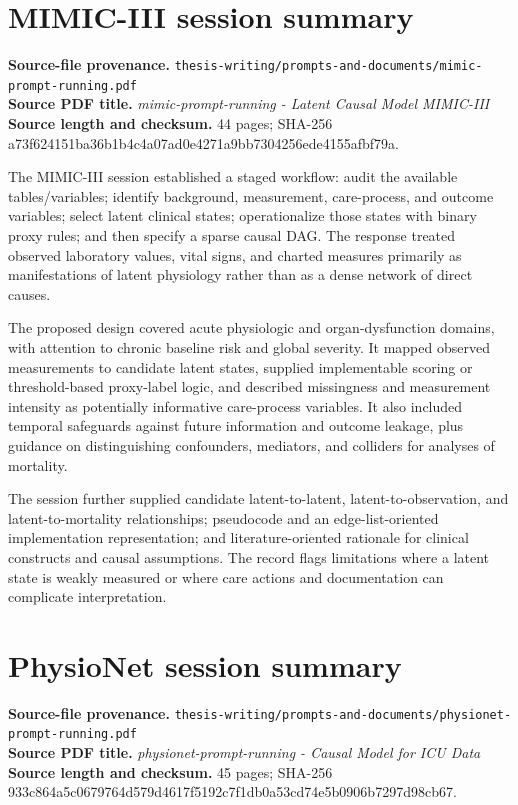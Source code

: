 \documentclass[11pt,a4paper]{article}
\newcommand{\sourcepath}[1]{{\footnotesize\nolinkurl{#1}}}
\newcommand{\mimichash}{{\scriptsize\ttfamily 56271465\allowbreak a73f6241\allowbreak 51ba36b1\allowbreak b4c4a07a\allowbreak d0e4271a\allowbreak 9bb73042\allowbreak 56ede415\allowbreak 5afbf79a}}
\newcommand{\physionethash}{{\scriptsize\ttfamily 933c864a\allowbreak 5c067976\allowbreak 4d579d46\allowbreak 17f5192c\allowbreak 7f1db0a5\allowbreak 3cd74e5b\allowbreak 0906b729\allowbreak 7d98cb67}}
\begin{document}
\section{MIMIC-III session summary}
\textbf{Source-file provenance.} \sourcepath{thesis-writing/prompts-and-documents/mimic-prompt-running.pdf}\\
\textbf{Source PDF title.} \emph{mimic-prompt-running - Latent Causal Model MIMIC-III}\\
\textbf{Source length and checksum.} 44 pages; SHA-256 \mimichash.

The MIMIC-III session established a staged workflow: audit the available
tables/variables; identify background, measurement, care-process, and outcome
variables; select latent clinical states; operationalize those states with
binary proxy rules; and then specify a sparse causal DAG. The response treated
observed laboratory values, vital signs, and charted measures primarily as
manifestations of latent physiology rather than as a dense network of direct
causes.

The proposed design covered acute physiologic and organ-dysfunction domains,
with attention to chronic baseline risk and global severity. It mapped observed
measurements to candidate latent states, supplied implementable scoring or
threshold-based proxy-label logic, and described missingness and measurement
intensity as potentially informative care-process variables. It also included
temporal safeguards against future information and outcome leakage, plus
guidance on distinguishing confounders, mediators, and colliders for analyses
of mortality.

The session further supplied candidate latent-to-latent, latent-to-observation,
and latent-to-mortality relationships; pseudocode and an edge-list-oriented
implementation representation; and literature-oriented rationale for clinical
constructs and causal assumptions. The record flags limitations where a latent
state is weakly measured or where care actions and documentation can complicate
interpretation.

\section{PhysioNet session summary}
\textbf{Source-file provenance.} \sourcepath{thesis-writing/prompts-and-documents/physionet-prompt-running.pdf}\\
\textbf{Source PDF title.} \emph{physionet-prompt-running - Causal Model for ICU Data}\\
\textbf{Source length and checksum.} 45 pages; SHA-256 \physionethash.
\end{document}
